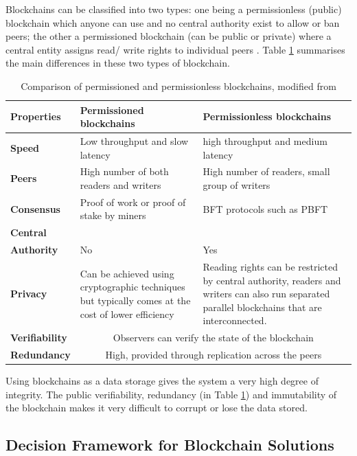 Blockchains can be classified into two types: one being a permissionless (public) blockchain which anyone can 
use and no central authority exist to allow or ban peers; the other a permissioned blockchain (can be public or private)
where a central entity assigns read/ write rights to individual peers \citep[p.1]{wust2017you}. Table \ref{table:permvsless} 
summarises the main differences in these two types of blockchain.

\begin{table}[!ht] 
    \caption{Comparison of permissioned and permissionless blockchains, modified from \citet[p.3]{wust2017you}}
    \centering
    \label{table:permvsless}
    \begin{tabularx}{\textwidth}{>{\bfseries}lXX}
        Properties & Permissioned blockchains & Permissionless blockchains\\
        \toprule
        Speed & Low throughput and slow latency & high throughput and medium latency\\\midrule
        Peers & High number of both readers and writers & High number of readers, small group of writers\\\midrule
        Consensus & Proof of work or proof of stake by miners & BFT protocols such as PBFT\\\midrule
        Central\\Authority & No & Yes\\\midrule
        Privacy & Can be achieved using cryptographic techniques but typically comes at the cost of lower efficiency & 
        Reading rights can be restricted by central authority, readers and writers can also run separated parallel blockchains that are interconnected. \\\midrule
        Verifiability & \multicolumn{2}{c}{Observers can verify the state of the blockchain} \\\midrule
        Redundancy & \multicolumn{2}{c}{High, provided through replication across the peers}
        \\\bottomrule
    \end{tabularx}
\end{table}

Using blockchains as a data storage gives the system a very high degree of integrity. The public verifiability, 
redundancy (in Table \ref{table:permvsless}) and immutability of the blockchain makes it very difficult to 
corrupt or lose the data stored.

\subsection{Decision Framework for Blockchain Solutions}

